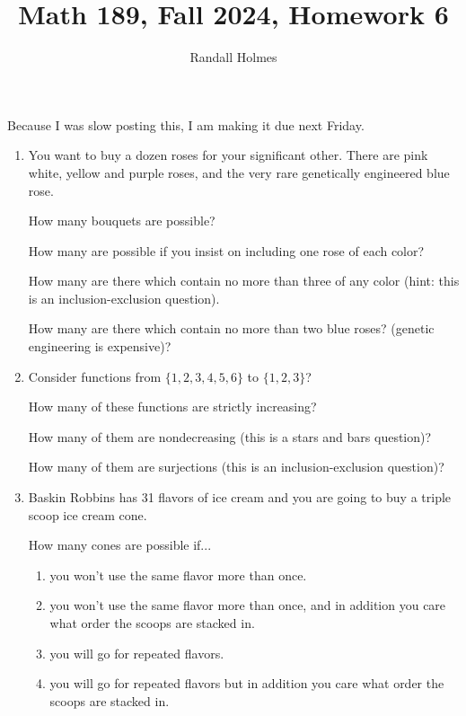 \documentclass[12pt]{article}
\title{Math 189, Fall 2024, Homework 6}
\author{Randall Holmes}
\begin{document}
\maketitle

Because I was slow posting this, I am making it due next Friday.

\begin{enumerate}

\item  You want to buy a dozen roses for your significant other.   There are pink white, yellow and purple roses, and the very rare genetically engineered blue rose.

How many bouquets are possible?

How many are possible if you insist on including one rose of each color?

How many are there which contain no more than three of any color (hint:  this is an inclusion-exclusion question).

How many are there which contain no more than two blue roses?  (genetic engineering is expensive)?

\item   Consider functions from $\{1,2,3,4,5,6\}$ to $\{1,2,3\}$?

How many of these functions are strictly increasing?

How many of them are nondecreasing (this is a stars and bars question)?

How many of them are surjections (this is an inclusion-exclusion question)?

\item  Baskin Robbins has 31 flavors of ice cream and you are going to buy a triple scoop ice cream cone.

How many cones are possible if...

\begin{enumerate}

\item  you won't use the same flavor more than once.

\item  you won't use the same flavor more than once, and in addition you care what order the scoops are stacked in.

\item  you will go for repeated flavors.

\item  you will go for repeated flavors but in addition you care what order the scoops are stacked in.


\end{enumerate}
\end{enumerate}
\end{document}
